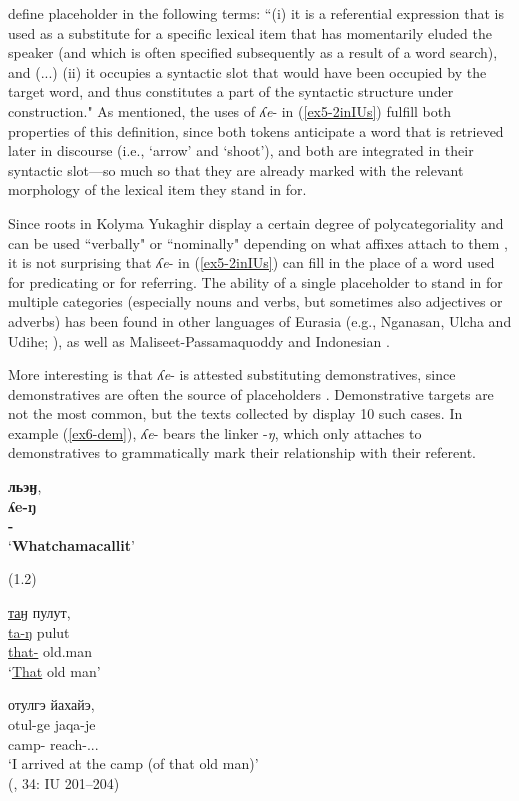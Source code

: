 \documentclass[output=paper,colorlinks,citecolor=brown
\ChapterDOI{10.5281/zenodo.15697581}
]{langscibook}
\begin{document}
\citet[37]{Hayashi&Yoon2010} define placeholder in the following terms: ``(i) it is a referential expression that is used as a substitute for a specific lexical item that has momentarily eluded the speaker (and which is often specified subsequently as a result of a word search), and (...) (ii) it occupies a syntactic slot that would have been occupied by the target word, and thus constitutes a part of the syntactic structure under construction."
As mentioned, the uses of \textit{ʎe}- in (\ref{ex5-2inIUs}) fulfill both properties of this definition, since both tokens anticipate a word that is retrieved later in discourse (i.e., `arrow' and `shoot'), and both are integrated in their syntactic slot—so much so that they are already marked with the relevant morphology of the lexical item they stand in for.

Since roots in Kolyma Yukaghir display a certain degree of polycategoriality and can be used ``verbally" or ``nominally" depending on what affixes attach to them \citep{Ventayol-Boada-et-al2023}, it is not surprising that \textit{ʎe}- in (\ref{ex5-2inIUs}) can fill in the place of a word used for predicating or for referring. 
The ability of a single placeholder to stand in for multiple categories (especially nouns and verbs, but sometimes also adjectives or adverbs) has been found in other languages of Eurasia (e.g., Nganasan, Ulcha and Udihe; \citealt{Podlesskaya2010}), as well as Maliseet-Passamaquoddy \citep{LeSourd2003} and Indonesian \citep{Wouk2005}. 


More interesting is that \textit{ʎe}- is attested substituting demonstratives, since demonstratives are often the source of placeholders \citep{Hayashi&Yoon2010, Podlesskaya2010}. 
Demonstrative targets are not the most common, but the texts collected by \citet{Nikolaeva_Mayer2004} display 10 such cases. 
In example (\ref{ex6-dem}), \textit{ʎe}- bears the linker -\textit{ŋ}, which only attaches to demonstratives to grammatically mark their relationship with their referent.
 

\begin{exe}
\ex \label{ex6-dem}
    \glll \textbf{льэӈ}, \\
    \textbf{ʎe-ŋ} \\
    \textbf{\Ph-\Lnk{}} \\
    \glt `\textbf{Whatchamacallit}'

\sn   (1.2)

\sn
    \glll \uline{таӈ} пулут, \\
    \uline{ta-ŋ} pulut \\
    \uline{that-\Lnk{}} old.man \\
    \glt `\uline{That} old man'

\sn
    \glll отулгэ йахайэ,  \\
    otul-ge jaqa-je \\
    camp-\Loc{} reach-\Ass.\Intr.\Ef.\Fsg{} \\
    \glt `I arrived at the camp (of that old man)' \\
    \null \hfill (\citealt{Nikolaeva_Mayer2004}, 34: IU 201--204)
\end{exe}
\end{document}
